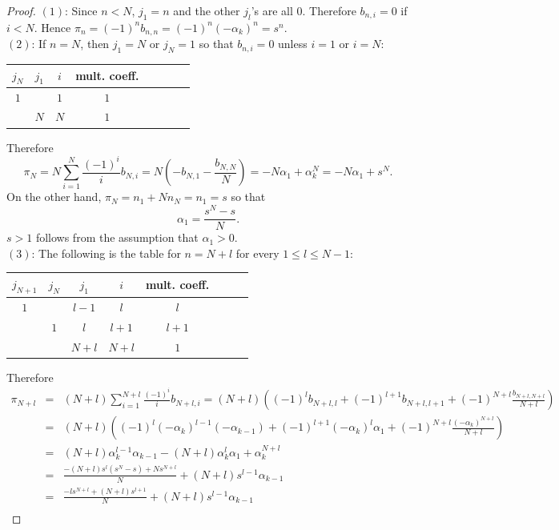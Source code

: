 \documentclass[10pt,a4paper]{amsart}
\begin{document}
\begin{proof}
$(1)$: Since $n<N$, $j_1=n$ and the other $j_l$'s are all $0$. Therefore $b_{n, i}=0$ if $i<N$. Hence  $\pi_n=(-1)^nb_{n, n}=(-1)^n(-\alpha_k)^n=s^n$.\\
$(2)$: If $n=N$, then $j_1=N$ or $j_N=1$ so that $b_{n, i}=0$ unless $i=1$ or $i=N$:
\begin{center}
\begin{tabular}{ |c|c|c|c|c|c|c|c| }
\hline
    $j_{N}$ & $j_1$ & $i$ & mult. coeff.\\
\hline
   $1$ &  & $1$ & $1$\\ 
\hline
      & $N$ & $N$ & $1$\\ 
\hline
\end{tabular}
\end{center}  
Therefore 
$$\pi_N=N\sum^N_{i=1}\frac{(-1)^i}{i}
b_{N, i}=N\left(-b_{N, 1}-\frac{b_{N, N}}{N}\right)=-N\alpha_1+\alpha_k^N=-N\alpha_1+s^N.$$
On the other hand, $\pi_N=n_1+Nn_N=n_1=s$ so that 
$$\alpha_1=\frac{s^N-s}{N}.$$
$s>1$ follows from the assumption that $\alpha_1>0$.\\

$(3)$: The following is the table for $n=N+l$ for every $1\leq l\leq N-1$:
\begin{center}
\begin{tabular}{ |c|c|c|c|c|c|c|c| }
\hline
  $j_{N+1}$ & $j_{N}$ & $j_1$ & $i$ & mult. coeff.\\
\hline
 $1$ & & $l-1$ & $l$ & $l$\\ 
\hline
    & $1$  & $l$ & $l+1$ & $l+1$\\ 
\hline
   &  & $N+l$ & $N+l$ & $1$\\ 
\hline
\end{tabular}
\end{center}  

Therefore 
\begin{eqnarray*}
    \pi_{N+l}&=&(N+l)\sum^{N+l}_{i=1}\frac{(-1)^i}{i}
b_{N+l, i}=(N+l)\left((-1)^lb_{N+l, l}+(-1)^{l+1}b_{N+l, l+1}+(-1)^{N+l}\frac{b_{N+l, N+l}}{N+l}\right)\\
    &=&(N+l)\left((-1)^l(-\alpha_k)^{l-1}(-\alpha_{k-1})+(-1)^{l+1}(-\alpha_k)^l\alpha_1+(-1)^{N+l}\frac{(-\alpha_k)^{N+l}}{N+l}\right)\\
    &=&(N+l)\alpha_k^{l-1}\alpha_{k-1}-(N+l)\alpha_k^l\alpha_1+\alpha_k^{N+l}\\
    &=&\frac{-(N+l)s^l(s^N-s)+Ns^{N+l}}{N}+(N+l)s^{l-1}\alpha_{k-1}\\
    &=&\frac{-ls^{N+l}+(N+l)s^{l+1}}{N}+(N+l)s^{l-1}\alpha_{k-1}\\
\end{eqnarray*}


\end{proof}
\end{document}
